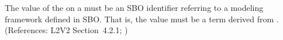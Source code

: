 The value of the   on a \Model must be an SBO
identifier referring to a modeling framework defined in SBO.  That is, the
value must be a term derived from \sboframework.  (References: L2V2
Section~4.2.1; )
